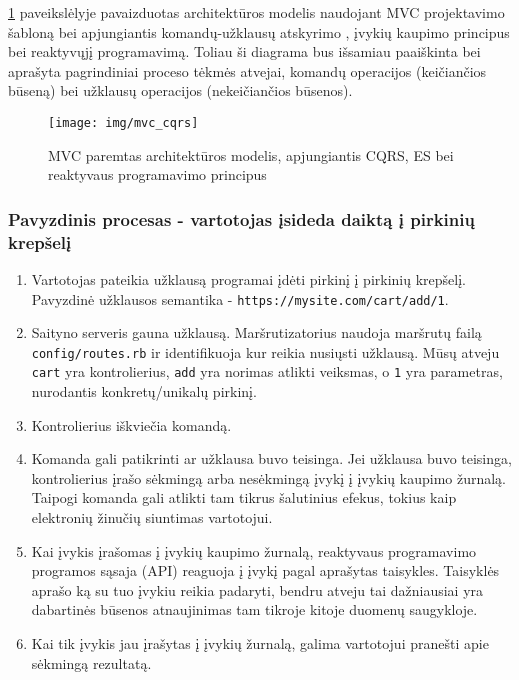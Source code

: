 \ref{img:mvc_cqrs} paveikslėlyje pavaizduotas architektūros modelis naudojant MVC projektavimo šabloną bei apjungiantis komandų-užklausų atskyrimo , įvykių kaupimo principus bei reaktyvųjį programavimą. Toliau ši diagrama bus išsamiau paaiškinta bei aprašyta pagrindiniai proceso tėkmės atvejai, komandų operacijos (keičiančios būseną) bei užklausų operacijos (nekeičiančios būsenos).

\begin{figure}[H]
    \centering
    \texttt{[image: img/mvc\_cqrs]}
    \caption{MVC paremtas architektūros modelis, apjungiantis CQRS, ES bei reaktyvaus programavimo principus}
    \label{img:mvc_cqrs}
\end{figure}

\subsubsection{Pavyzdinis procesas - vartotojas įsideda daiktą į pirkinių krepšelį}

\begin{enumerate}
  \item Vartotojas pateikia užklausą programai įdėti pirkinį į pirkinių krepšelį. Pavyzdinė užklausos semantika - \lstinline|https://mysite.com/cart/add/1|.

  \item Saityno serveris gauna užklausą. Maršrutizatorius naudoja maršrutų failą \lstinline|config/routes.rb| ir identifikuoja kur reikia nusiųsti užklausą. Mūsų atveju \lstinline|cart| yra kontrolierius, \lstinline|add| yra norimas atlikti veiksmas, o \lstinline|1| yra parametras, nurodantis konkretų/unikalų pirkinį.

  \item Kontrolierius iškviečia komandą.

  \item Komanda gali patikrinti ar užklausa buvo teisinga. Jei užklausa buvo teisinga, kontrolierius įrašo sėkmingą arba nesėkmingą įvykį į įvykių kaupimo žurnalą. Taipogi komanda gali atlikti tam tikrus šalutinius efekus, tokius kaip elektronių žinučių siuntimas vartotojui.

  \item Kai įvykis įrašomas į įvykių kaupimo žurnalą, reaktyvaus programavimo programos sąsaja (API) reaguoja į įvykį pagal aprašytas taisykles. Taisyklės aprašo ką su tuo įvykiu reikia padaryti, bendru atveju tai dažniausiai yra dabartinės būsenos atnaujinimas tam tikroje kitoje duomenų saugykloje.

  \item Kai tik įvykis jau įrašytas į įvykių žurnalą, galima vartotojui pranešti apie sėkmingą rezultatą.
\end{enumerate}

